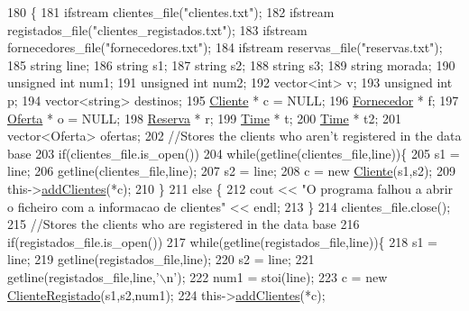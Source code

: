 \begin{DoxyCode}
180                   \{
181     ifstream clientes\_file(\textcolor{stringliteral}{"clientes.txt"});
182     ifstream registados\_file(\textcolor{stringliteral}{"clientes\_registados.txt"});
183     ifstream fornecedores\_file(\textcolor{stringliteral}{"fornecedores.txt"});
184     ifstream reservas\_file(\textcolor{stringliteral}{"reservas.txt"});
185     \textcolor{keywordtype}{string} line;
186     \textcolor{keywordtype}{string} s1;
187     \textcolor{keywordtype}{string} s2;
188     \textcolor{keywordtype}{string} s3;
189     \textcolor{keywordtype}{string} morada;
190     \textcolor{keywordtype}{unsigned} \textcolor{keywordtype}{int} num1;
191     \textcolor{keywordtype}{unsigned} \textcolor{keywordtype}{int} num2;
192     vector<int> v;
193     \textcolor{keywordtype}{unsigned} \textcolor{keywordtype}{int} p;
194     vector<string> destinos;
195     \hyperlink{classCliente}{Cliente} * c = NULL;
196     \hyperlink{classFornecedor}{Fornecedor} * f;
197     \hyperlink{classOferta}{Oferta} * o = NULL;
198     \hyperlink{classReserva}{Reserva} * r;
199     \hyperlink{classTime}{Time} * t;
200     \hyperlink{classTime}{Time} * t2;
201     vector<Oferta> ofertas;
202     \textcolor{comment}{//Stores the clients who aren't registered in the data base}
203     \textcolor{keywordflow}{if}(clientes\_file.is\_open())
204         \textcolor{keywordflow}{while}(getline(clientes\_file,line))\{
205             s1 = line;
206             getline(clientes\_file,line);
207             s2 = line;
208             c = \textcolor{keyword}{new} \hyperlink{classCliente}{Cliente}(s1,s2);
209             this->\hyperlink{classEmpresa_a57597ec4154f274686bc648ccf5d2a59}{addClientes}(*c);
210         \}
211     \textcolor{keywordflow}{else} \{
212         cout << \textcolor{stringliteral}{"O programa falhou a abrir o ficheiro com a informacao de clientes"} << endl;
213     \}
214     clientes\_file.close();
215     \textcolor{comment}{//Stores the clients who are registered in the data base}
216     \textcolor{keywordflow}{if}(registados\_file.is\_open())
217             \textcolor{keywordflow}{while}(getline(registados\_file,line))\{
218                 s1 = line;
219                 getline(registados\_file,line);
220                 s2 = line;
221                 getline(registados\_file,line,\textcolor{charliteral}{'\(\backslash\)n'});
222                 num1 = stoi(line);
223                 c = \textcolor{keyword}{new} \hyperlink{classClienteRegistado}{ClienteRegistado}(s1,s2,num1);
224                 this->\hyperlink{classEmpresa_a57597ec4154f274686bc648ccf5d2a59}{addClientes}(*c);

\end{DoxyCode}
